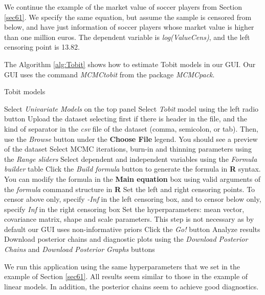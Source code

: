 We continue the example of the market value of soccer players from Section \ref{sec61}. We specify the same equation, but assume the sample is censored from below, and have just information of soccer players whose market value is higher than one million euros. The dependent variable is \textit{log(ValueCens)}, and the left censoring point is 13.82.

The Algorithm \ref{alg:Tobit} shows how to estimate Tobit models in our GUI. Our GUI uses the command \textit{MCMCtobit} from the package \textit{MCMCpack}. 

\begin{algorithm}[h!]
	\caption{Tobit models}\label{alg:Tobit}
	\begin{algorithmic}[1]  		 			
		\State Select \textit{Univariate Models} on the top panel
		\State Select \textit{Tobit} model using the left radio button
		\State Upload the dataset selecting first if there is header in the file, and the kind of separator in the \textit{csv} file of the dataset (comma, semicolon, or tab). Then, use the \textit{Browse} button under the \textbf{Choose File} legend. You should see a preview of the dataset
		\State Select MCMC iterations, burn-in and thinning parameters using the \textit{Range sliders}
		\State Select dependent and independent variables using the \textit{Formula builder} table
		\State Click the \textit{Build formula} button to generate the formula in \textbf{R} syntax. You can modify the formula in the \textbf{Main equation} box using valid arguments of the \textit{formula} command structure in \textbf{R}
		\State Set the left and right censoring points. To censor above only, specify \textit{-Inf} in the left censoring box, and to censor below only, specify \textit{Inf} in the right censoring box
		\State Set the hyperparameters: mean vector, covariance matrix, shape and scale parameters. This step is not necessary as by default our GUI uses non-informative priors
		\State Click the \textit{Go!} button
		\State Analyze results
		\State Download posterior chains and diagnostic plots using the \textit{Download Posterior Chains} and \textit{Download Posterior Graphs} buttons
	\end{algorithmic} 
\end{algorithm}

We run this application using the same hyperparameters that we set in the example of Section \ref{sec61}. All results seem similar to those in the example of linear models. In addition, the posterior chains seem to achieve good diagnostics.
 
